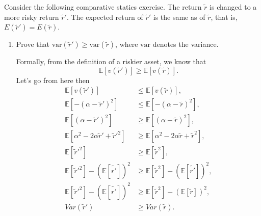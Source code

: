 \documentclass[11pt,english]{article}
\begin{document}
\noindent Consider the following comparative statics exercise. The return $\tilde{r}$ is
changed to a more risky return $\tilde{r}'$. The expected return of $\tilde{r}'$
is the same as of $\tilde{r}$, that is, $E(\tilde{r}') = E(\tilde{r})$.
 
\begin{enumerate}
    \item[(b)] Prove that $\mathrm{var}(\tilde{r}') \geq \mathrm{var}(\tilde{r})$,
        where $\mathrm{var}$ denotes the variance.
    \begin{solution}
 Formally, from the definition of a riskier asset, we know that $$\mathbb{E}[v(\tilde{r}')] \geq \mathbb{E}[v(\tilde{r})].$$ Let's go from here then
\begin{align*}
\mathbb{E}[v(\tilde{r}')] &\leq \mathbb{E}[v(\tilde{r})],\\
\mathbb{E}[-(\alpha - \tilde{r}')^2] &\leq \mathbb{E}[-(\alpha - \tilde{r})^2],\\
\mathbb{E}[(\alpha - \tilde{r}')^2] &\geq \mathbb{E}[(\alpha - \tilde{r})^2],\\
\mathbb{E}[\alpha^2 - 2\alpha\tilde{r}'+ \tilde{r}'^2] &\geq \mathbb{E}[\alpha^2 - 2\alpha\tilde{r}+ \tilde{r}^2],\\
\mathbb{E}[\tilde{r}'^2] &\geq \mathbb{E}[\tilde{r}^2],\\
\mathbb{E}[\tilde{r}'^2] - (\mathbb{E}[\tilde{r'}])^2 &\geq \mathbb{E}[\tilde{r}^2] - (\mathbb{E}[\tilde{r'}])^2,\\
\mathbb{E}[\tilde{r}'^2] - (\mathbb{E}[\tilde{r'}])^2 &\geq \mathbb{E}[\tilde{r}^2] - (\mathbb{E}[\tilde{r}])^2,\\
Var(\tilde{r}') &\geq Var(\tilde{r}).
\end{align*}
    \end{solution}
 

\end{enumerate}
\end{document}
